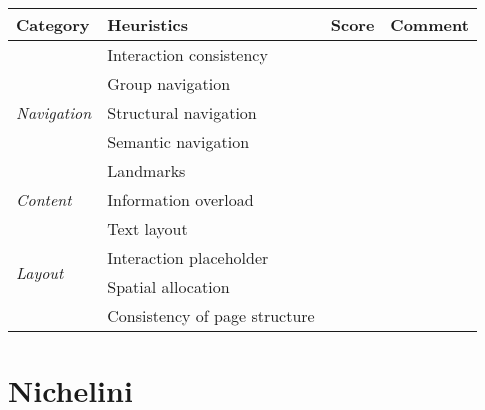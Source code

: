 \documentclass[a4paper, 11pt, parskip=half]{scrreprt}
\begin{document}
\begin{center}
    \def\arraystretch{1.3}
    \begin{tabular}{|l|l|l|m{7cm}|}
        \hline
        \textbf{Category} & \textbf{Heuristics} & \textbf{Score} & \textbf{Comment} \\ \hline
        \multirow{5}{*}{\textit{Navigation}} & Interaction consistency & & \\ \cline{2-4}
        & Group navigation & & \\ \cline{2-4}
        & Structural navigation & & \\ \cline{2-4}
        & Semantic navigation & & \\ \cline{2-4}
        & Landmarks & & \\ \hline
        \multirow{1}{*}{\textit{Content}} & Information overload & & \\ \hline
        \multirow{4}{*}{\textit{Layout}} & Text layout & & \\ \cline{2-4}
        & Interaction placeholder & & \\ \cline{2-4}
        & Spatial allocation & & \\ \cline{2-4}
        & Consistency of page structure & & \\ \hline
    \end{tabular}
\end{center}

\section{Nichelini}
\end{document}
